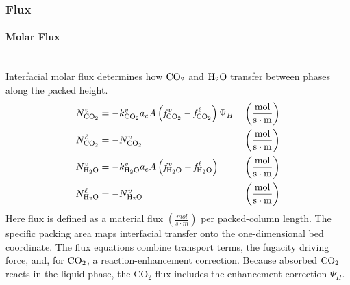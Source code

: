            \subsubsection{Flux}
                \paragraph{Molar Flux}\mbox{}\\[0.5em]
                Interfacial molar flux determines how $\COtwo$ and $\HtwoO$ transfer between phases along the packed height.
                \begin{align}
                    N^{\vap}_{ \COtwo} &=  -k^{\vap}_{ \COtwo}  a_e A  \left(\textit{f}^{\:\vap}_{ \COtwo} - \textit{f}^{\:\liq}_{ \COtwo}\right) \Psi _{H} && \left(\frac{\unit{mol}}{\unit{s\cdot m}} \right) \\
                    N^{\liq}_{ \COtwo} &= -N^{\vap}_{ \COtwo} && \left(\frac{\unit{mol}}{\unit{s\cdot m}} \right) \\
                    N^{\vap}_{ \HtwoO} &= -k^{\vap}_{ \HtwoO} a_e A \left(\textit{f}^{\:\vap}_{ \HtwoO} - \textit{f}^{\:\liq}_{ \HtwoO}\right)  && \left(\frac{\unit{mol}}{\unit{s\cdot m}} \right) \\
                    N^{\liq}_{ \HtwoO} &= -N^{\vap}_{ \HtwoO} && \left(\frac{\unit{mol}}{\unit{s\cdot m}} \right)
                \end{align}
                Here flux is defined as a material flux $\left(\frac{\unit{mol}}{\unit{s\cdot m}} \right)$ per packed-column length. The specific packing area maps interfacial transfer onto the one-dimensional bed coordinate. The flux equations combine transport terms, the fugacity driving force, and, for $\COtwo$, a reaction-enhancement correction. Because absorbed $\COtwo$ reacts in the liquid phase, the CO$_2$ flux includes the enhancement correction $\Psi_H$.

